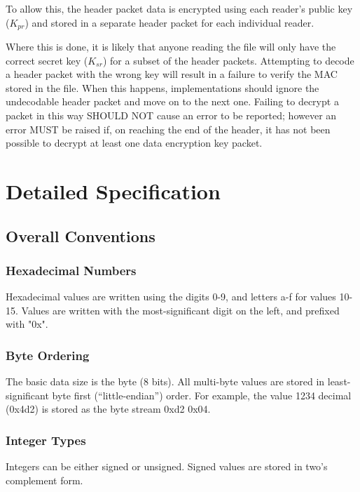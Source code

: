 \documentclass[10pt]{article}
\begin{document}
To allow this,
the header packet data is encrypted using each reader's public key ($K_{pr}$) and stored in a separate header packet
for each individual reader.

Where this is done, it is likely that anyone reading the file will only have the correct secret key ($K_{sr}$) for a
subset of the header packets.
Attempting to decode a header packet with the wrong key will result in a failure to verify the MAC stored in the file.
When this happens, implementations should ignore the undecodable header packet and move on to the next one.
Failing to decrypt a packet in this way SHOULD NOT cause an error to be reported;
however an error MUST be raised if, on reaching the end of the header,
it has not been possible to decrypt at least one data encryption key packet.

\section{Detailed Specification}
\subsection{Overall Conventions}
\subsubsection{Hexadecimal Numbers}
Hexadecimal values are written using the digits 0-9, and letters a-f for values 10-15.
Values are written with the most-significant digit on the left, and prefixed with "0x".

\subsubsection{Byte Ordering}
The basic data size is the byte (8 bits).
All multi-byte values are stored in least-significant byte first (``little-endian'') order.
For example, the value 1234 decimal (0x4d2) is stored as the byte stream 0xd2 0x04.

\subsubsection{Integer Types}
Integers can be either signed or unsigned.
Signed values are stored in two's complement form.
\end{document}
